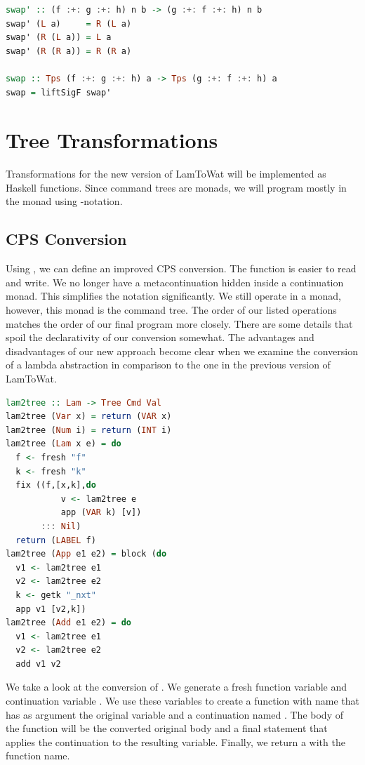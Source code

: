 \begin{lstlisting}[language=Haskell]
swap' :: (f :+: g :+: h) n b -> (g :+: f :+: h) n b
swap' (L a)     = R (L a)
swap' (R (L a)) = L a
swap' (R (R a)) = R (R a)

swap :: Tps (f :+: g :+: h) a -> Tps (g :+: f :+: h) a
swap = liftSigF swap'
\end{lstlisting}

\section{\label{section:treensforms}Tree Transformations}
Transformations for the new version of LamToWat will be implemented as Haskell functions. Since command trees are monads, we will program mostly in the monad using -notation. 

\subsection{\label{subsection:cpsconvert2}CPS Conversion}
Using , we can define an improved CPS conversion. The function is easier to read and write. We no longer have a metacontinuation hidden inside a continuation monad. This simplifies the notation significantly. We still operate in a monad, however, this monad is the command tree. The order of our listed operations matches the order of our final program more closely. There are some details that spoil the declarativity of our conversion somewhat. The advantages and disadvantages of our new approach become clear when we examine the conversion of a lambda abstraction in comparison to the one in the previous version of LamToWat.

\begin{lstlisting}[language=Haskell]
lam2tree :: Lam -> Tree Cmd Val
lam2tree (Var x) = return (VAR x)
lam2tree (Num i) = return (INT i)
lam2tree (Lam x e) = do
  f <- fresh "f"
  k <- fresh "k"
  fix ((f,[x,k],do
           v <- lam2tree e
           app (VAR k) [v])
       ::: Nil)
  return (LABEL f)
lam2tree (App e1 e2) = block (do
  v1 <- lam2tree e1
  v2 <- lam2tree e2
  k <- getk "_nxt"
  app v1 [v2,k])
lam2tree (Add e1 e2) = do
  v1 <- lam2tree e1
  v2 <- lam2tree e2
  add v1 v2
\end{lstlisting}

We take a look at the conversion of . We generate a fresh function variable  and continuation variable . We use these variables to create a function with name  that has as argument the original variable and a continuation named . The body of the function will be the converted original body and a final statement that applies the continuation to the resulting variable. Finally, we return a  with the function name.

